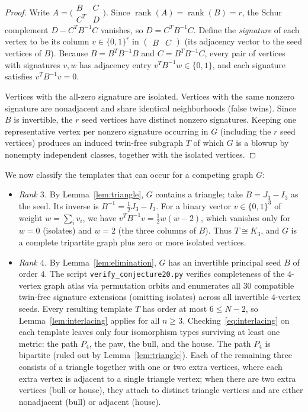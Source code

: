\documentclass[10pt]{article}
\begin{document}
\begin{proof}
Write $A = \bigl(\begin{smallmatrix} B & C \\ C^T & D \end{smallmatrix}\bigr)$. Since $\operatorname{rank}(A) = \operatorname{rank}(B) = r$, the Schur complement $D - C^T B^{-1} C$ vanishes, so $D = C^T B^{-1} C$. Define the \emph{signature} of each vertex to be its column $v \in \{0,1\}^r$ in $\begin{pmatrix} B & C \end{pmatrix}$ (its adjacency vector to the seed vertices of $B$). Because $B = B^T B^{-1} B$ and $C = B^T B^{-1} C$, every pair of vertices with signatures $v, w$ has adjacency entry $v^T B^{-1} w \in \{0, 1\}$, and each signature satisfies $v^T B^{-1} v = 0$.

Vertices with the all-zero signature are isolated. Vertices with the same nonzero signature are nonadjacent and share identical neighborhoods (false twins). Since $B$ is invertible, the $r$ seed vertices have distinct nonzero signatures. Keeping one representative vertex per nonzero signature occurring in $G$ (including the $r$ seed vertices) produces an induced twin-free subgraph $T$ of which $G$ is a blowup by nonempty independent classes, together with the isolated vertices.
\end{proof}

We now classify the templates that can occur for a competing graph $G$:
\begin{itemize}
\item \emph{Rank $3$.} By Lemma~\ref{lem:triangle}, $G$ contains a triangle; take $B = J_3 - I_3$ as the seed. Its inverse is $B^{-1} = \frac{1}{2}J_3 - I_3$. For a binary vector $v \in \{0,1\}^3$ of weight $w = \sum_i v_i$, we have $v^T B^{-1} v = \frac{1}{2}w(w-2)$, which vanishes only for $w = 0$ (isolates) and $w = 2$ (the three columns of $B$). Thus $T \cong K_3$, and $G$ is a complete tripartite graph plus zero or more isolated vertices.

\item \emph{Rank $4$.} By Lemma~\ref{lem:elimination}, $G$ has an invertible principal seed $B$ of order $4$. The script \nolinkurl{verify_conjecture20.py} verifies completeness of the $4$-vertex graph atlas via permutation orbits and enumerates all $30$ compatible twin-free signature extensions (omitting isolates) across all invertible $4$-vertex seeds. Every resulting template $T$ has order at most $6 \leq N - 2$, so Lemma~\ref{lem:interlacing} applies for all $n \geq 3$. Checking~\eqref{eq:interlacing} on each template leaves only four isomorphism types surviving at least one metric: the path $P_4$, the paw, the bull, and the house. The path $P_4$ is bipartite (ruled out by Lemma~\ref{lem:triangle}). Each of the remaining three consists of a triangle together with one or two extra vertices, where each extra vertex is adjacent to a single triangle vertex; when there are two extra vertices (bull or house), they attach to distinct triangle vertices and are either nonadjacent (bull) or adjacent (house).
\end{itemize}
\end{document}
